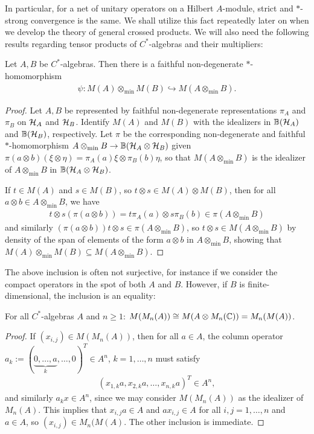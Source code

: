 In particular, for a net of unitary operators on a Hilbert $A$-module, strict and $*$-strong convergence is the same. We shall utilize this fact repeatedly later on when we develop the theory of general crossed products. We will also need the following results regarding tensor products of $C^*$-algebras and their multipliers:
\begin{theorem}
	Let $A,B$ be $C^*$-algebras. Then there is a faithful non-degenerate $*$-homomorphism
	\begin{align*}
		\psi \colon M(A) \otimes_{\min} M(B) \hookrightarrow M(A \otimes_{\min} B).
	\end{align*}
	\label{mult:mintens}
\end{theorem}
\begin{proof}
	Let $A,B$ be represented by faithful non-degenerate representations $\pi_A$ and $\pi_B$ on $\mathcal{H}_A$ and $\mathcal{H}_B$. Identify $M(A)$ and $M(B)$ with the idealizers in $\mathbb{B}(\mathcal{H}_A)$ and $\mathbb{B}(\mathcal{H}_B)$, respectively. Let $\pi$ be the corresponding non-degenerate and faithful $*$-homomorphism $A \otimes_{\min} B \to \mathbb{B}(\mathcal{H}_A \otimes \mathcal{H}_B)$ given $\pi(a \otimes b)(\xi \otimes \eta) = \pi_A(a) \xi \otimes \pi_B(b) \eta$, so that $M(A \otimes_{\min} B)$ is the idealizer of $A \otimes_{\min}B$ in $\mathbb{B}(\mathcal{H}_A \otimes \mathcal{H}_B)$.

	If $t \in M(A)$ and $s \in M(B)$, so $t \otimes s \in M(A) \otimes M(B)$, then for all $a \otimes b \in A \otimes_{\min} B$, we have 
	\begin{align*}
		t \otimes s (\pi(a \otimes b) ) = t \pi_A(a) \otimes s \pi_B(b) \in \pi(A \otimes_{\min} B)
	\end{align*}
	and similarly $(\pi(a \otimes b) ) t \otimes s \in \pi(A \otimes_{\min} B)$, so $t \otimes s \in M(A \otimes_{\min} B)$ by density of the span of elements of the form $a \otimes b$ in $A \otimes_{\min} B$, showing that $M(A) \otimes_{\min} M(B)  \subseteq M(A \otimes_{\min} B)$.
\end{proof}
The above inclusion is often not surjective, for instance if we consider the compact operators in the spot of both $A$ and $B$. However, if $B$ is finite-dimensional, the inclusion is an equality:
\begin{lemma}
	For all $C^*$-algebras $A$ and $n \geq 1$: $ M(M_n(A)) \cong M(A \otimes M_n(\mathbb{C}) ) = M_n(M(A))$.
\end{lemma}
\begin{proof}
	If $(x_{i,j}) \in M(M_n(A))$, then for all $a \in A$, the column operator $a_k := (\underbrace{ 0,\dots, a}_{k} ,\dots,0)^T \in A^n $, $k=1,\dots,n$ must satisfy
	\begin{align*}
		(x_{1,k}a,x_{2,k}a,\dots,x_{n,k}a)^T \in A^n,
	\end{align*}
	and similarly $a_kx \in A^n$, since we may consider $M(M_n(A))$ as the idealizer of $M_n(A)$. This implies that $x_{i,j}a \in A$ and $ax_{i,j} \in A$ for all $i,j=1,\dots,n$ and $a \in A$, so $(x_{i,j}) \in M_n(M(A)$. The other inclusion is immediate. 
\end{proof}
